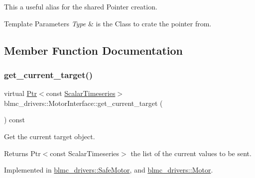This a useful alias for the shared Pointer creation. 


\begin{DoxyTemplParams}{Template Parameters}
{\em Type} & is the Class to crate the pointer from. \\
\hline
\end{DoxyTemplParams}


\subsection{Member Function Documentation}
\mbox{\label{classblmc__drivers_1_1MotorInterface_a167ffe5df0412b9abcac9a93861e58d2}} 
\subsubsection{\texorpdfstring{get\+\_\+current\+\_\+target()}{get\_current\_target()}}
{\footnotesize\ttfamily virtual \hyperlink{classblmc__drivers_1_1MotorInterface_ae31f230b9da3674a05543023c90b124c}{Ptr}$<$const \hyperlink{classblmc__drivers_1_1MotorInterface_a49b8fc916b9f9debbd7b0988463db5cd}{Scalar\+Timeseries}$>$ blmc\+\_\+drivers\+::\+Motor\+Interface\+::get\+\_\+current\+\_\+target (\begin{DoxyParamCaption}{ }\end{DoxyParamCaption}) const\hspace{0.3cm}{\ttfamily [pure virtual]}}



Get the current target object. 

\begin{DoxyReturn}{Returns}
Ptr$<$const Scalar\+Timeseries$>$ the list of the current values to be sent. 
\end{DoxyReturn}


Implemented in \hyperlink{classblmc__drivers_1_1SafeMotor_ae40e4c51272c46f037ea0ba393b2033e}{blmc\+\_\+drivers\+::\+Safe\+Motor}, and \hyperlink{classblmc__drivers_1_1Motor_ace26e74e3c8072c8bee867a2a0a7e013}{blmc\+\_\+drivers\+::\+Motor}.

\mbox{\label{classblmc__drivers_1_1MotorInterface_a7f6afed670f078518ccb46e1e3b44892}} 
